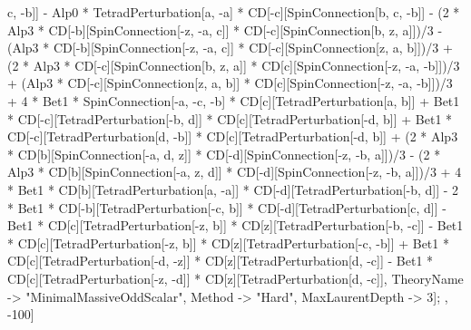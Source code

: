 c, -b]] - Alp0 * TetradPerturbation[a, -a] * CD[-c][SpinConnection[b, c, -b]] - (2 * Alp3 * CD[-b][SpinConnection[-z, -a, c]] * CD[-c][SpinConnection[b, z, a]])/3 - (Alp3 * CD[-b][SpinConnection[-z, -a, c]] * CD[-c][SpinConnection[z, a, b]])/3 + (2 * Alp3 * CD[-c][SpinConnection[b, z, a]] * CD[c][SpinConnection[-z, -a, -b]])/3 + (Alp3 * CD[-c][SpinConnection[z, a, b]] * CD[c][SpinConnection[-z, -a, -b]])/3 + 4 * Bet1 * SpinConnection[-a, -c, -b] * CD[c][TetradPerturbation[a, b]] + Bet1 * CD[-c][TetradPerturbation[-b, d]] * CD[c][TetradPerturbation[-d, b]] + Bet1 * CD[-c][TetradPerturbation[d, -b]] * CD[c][TetradPerturbation[-d, b]] + (2 * Alp3 * CD[b][SpinConnection[-a, d, z]] * CD[-d][SpinConnection[-z, -b, a]])/3 - (2 * Alp3 * CD[b][SpinConnection[-a, z, d]] * CD[-d][SpinConnection[-z, -b, a]])/3 + 4 * Bet1 * CD[b][TetradPerturbation[a, -a]] * CD[-d][TetradPerturbation[-b, d]] - 2 * Bet1 * CD[-b][TetradPerturbation[-c, b]] * CD[-d][TetradPerturbation[c, d]] - Bet1 * CD[c][TetradPerturbation[-z, b]] * CD[z][TetradPerturbation[-b, -c]] - Bet1 * CD[c][TetradPerturbation[-z, b]] * CD[z][TetradPerturbation[-c, -b]] + Bet1 * CD[c][TetradPerturbation[-d, -z]] * CD[z][TetradPerturbation[d, -c]] - Bet1 * CD[c][TetradPerturbation[-z, -d]] * CD[z][TetradPerturbation[d, -c]], TheoryName -> "MinimalMassiveOddScalar", Method -> "Hard", MaxLaurentDepth -> 3]; , -100]